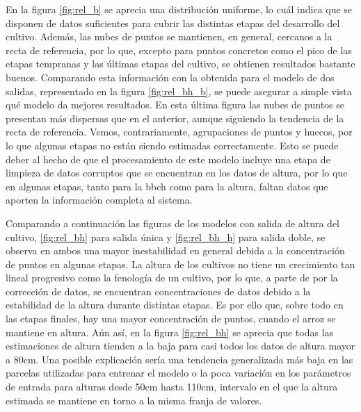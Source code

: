 \par En la figura \ref{fig:rel_b} se aprecia una distribución uniforme, lo cuál indica que se disponen de datos suficientes para cubrir las distintas etapas del desarrollo del cultivo. Además, las nubes de puntos se mantienen, en general, cercanos a la recta de referencia, por lo que, excepto para puntos concretos como el pico de las etapas tempranas y las últimas etapas del cultivo, se obtienen resultados bastante buenos. Comparando esta información con la obtenida para el modelo de dos salidas, representado en la figura \ref{fig:rel_bh_b}, se puede asegurar a simple vista qué modelo da mejores resultados. En esta última figura las nubes de puntos se presentan más dispersas que en el anterior, aunque siguiendo la tendencia de la recta de referencia. Vemos, contrariamente, agrupaciones de puntos y huecos, por lo que algunas etapas no están siendo estimadas correctamente. Esto se puede deber al hecho de que el procesamiento de este modelo incluye una etapa de limpieza de datos corruptos que se encuentran en los datos de altura, por lo que en algunas etapas, tanto para la \gls{bbch} como  para la altura, faltan datos que aporten la información completa al sistema. 
\\
\par Comparando a continuación las figuras de los modelos con salida de altura del cultivo, \ref{fig:rel_bh} para salida única y \ref{fig:rel_bh_h} para salida doble, se observa en ambos una mayor inestabilidad en general debida a la concentración de puntos en algunas etapas. La altura de los cultivos no tiene un crecimiento tan lineal progresivo como la fenología de un cultivo, por lo que, a parte de por la corrección de datos, se encuentran concentraciones de datos debido a la estabilidad de la altura durante distintas etapas. Es por ello que, sobre todo en las etapas finales, hay una mayor concentración de puntos, cuando el arroz se mantiene en altura. Aún así, en la figura \ref{fig:rel_bh} se aprecia que todas las estimaciones de altura tienden a la baja para casi todos los datos de altura mayor a 80cm. Una posible explicación sería una tendencia generalizada más baja en las parcelas utilizadas para entrenar el modelo o la poca variación en los parámetros de entrada para alturas desde 50cm hasta 110cm, intervalo en el que la altura estimada se mantiene en torno a la misma franja de valores. 

